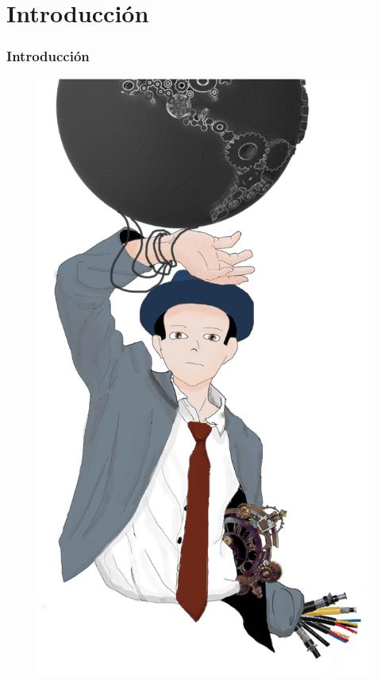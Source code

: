 \section{Introducci\'on}

\begin{frame}
\frametitle{Introducci\'on}
\begin{figure}[h]
\centering
\includegraphics[width=0.85\columnwidth]{Imagenes/intro1.eps}
\end{figure} 
\end{frame}


